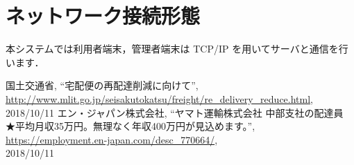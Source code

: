 \documentclass[a4j,titlepage]{jarticle}
\begin{document}
\section{ネットワーク接続形態}
本システムでは利用者端末，管理者端末は TCP/IP を用いてサーバと通信を行います．




\begin{thebibliography}{9}

国土交通省,
\newblock ``宅配便の再配達削減に向けて'',\\
\newblock \url{http://www.mlit.go.jp/seisakutokatsu/freight/re_delivery_reduce.html}, \\
2018/10/11
エン・ジャパン株式会社,
\newblock ``ヤマト運輸株式会社 中部支社の配達員　★平均月収35万円。無理なく年収400万円が見込めます。'',\\
\newblock \url{https://employment.en-japan.com/desc_770664/}, \\
2018/10/11
\end{thebibliography}
\end{document}
